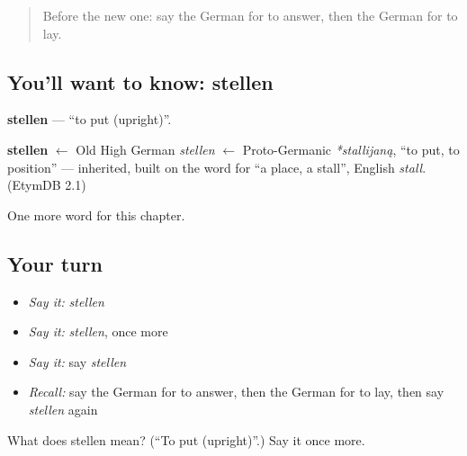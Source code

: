 \begin{quote}
Before the new one: say the German for to answer, then the German for to lay.
\end{quote}

\subsection*{You'll want to know: stellen}
\textbf{stellen} — \textquotedblleft{}to put (upright)\textquotedblright{}.

\begin{cousinweb}
\textbf{stellen} $\leftarrow$ Old High German \emph{stellen} $\leftarrow$ Proto-Germanic \emph{*stallijaną}, \textquotedblleft{}to put, to position\textquotedblright{} — inherited, built on the word for \textquotedblleft{}a place, a stall\textquotedblright{}, English \emph{stall}. (EtymDB 2.1)
\end{cousinweb}

\begin{grammarlens}[title={What you've built}]
One more word for this chapter.
\end{grammarlens}

\subsection*{Your turn}
\begin{itemize}
\raggedright
  \item \emph{Say it:} \emph{stellen}
  \item \emph{Say it:} \emph{stellen}, once more
  \item \emph{Say it:} say \emph{stellen}
  \item \emph{Recall:} say the German for to answer, then the German for to lay, then say \emph{stellen} again
\end{itemize}

\begin{tcolorbox}[breakable,colback=teal!4,colframe=teal!35!black,title={Before you move on}]
What does stellen mean? (\textquotedblleft{}To put (upright)\textquotedblright{}.) Say it once more.
\end{tcolorbox}
